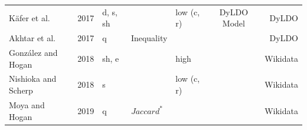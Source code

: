 \documentclass[sw]{iosart2x}
\begin{document}
\begin{table}[]
\begin{tabular}{lrlllcr}
		K{\"{a}}fer et al. \cite{KaferWA17} & 2017 & d, s, sh &  & low (c, r)  & DyLDO  Model  & DyLDO \\
		Akhtar et al. \cite{AkhtarAL17} & 2017 & q & Inequality &  &   & DyLDO \\ 
		Gonz\'{a}lez and Hogan \cite{GonzalezH18} & 2018 & sh, e &  & high  &  & Wikidata \\
		Nishioka and Scherp \cite{NishiokaS18} & 2018 & s &  & low (c, r)  &  & Wikidata \\
		Moya and Hogan \cite{LoustaunauH19} & 2019 & q & $Jaccard^*$ &  &  & Wikidata \\
		\hline
	\end{tabular}%
\end{table}%

\end{document}
